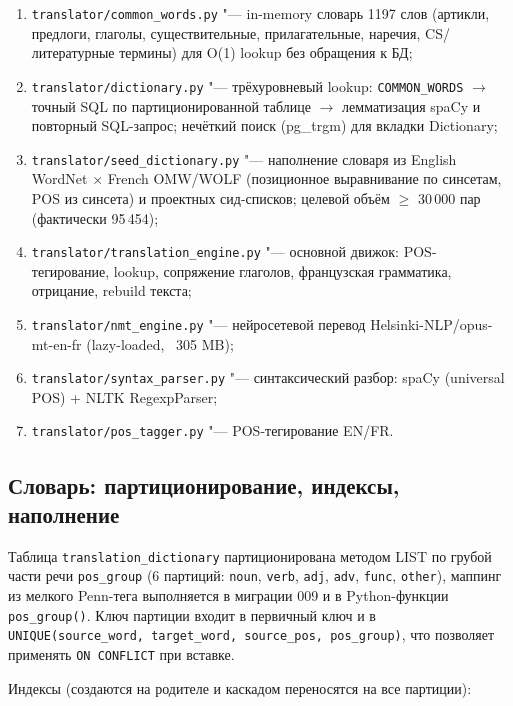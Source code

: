 \begin{enumerate}
	\item \texttt{translator/common\_words.py} "--- in-memory словарь 1197 слов
	      (артикли, предлоги, глаголы, существительные, прилагательные, наречия,
	      CS/литературные термины) для O(1) lookup без обращения к БД;
	\item \texttt{translator/dictionary.py} "--- трёхуровневый lookup:
	      \texttt{COMMON\_WORDS} $\to$ точный SQL по партиционированной
	      таблице $\to$ лемматизация spaCy и повторный SQL-запрос;
	      нечёткий поиск (pg\_trgm) для вкладки Dictionary;
	\item \texttt{translator/seed\_dictionary.py} "--- наполнение словаря
	      из English WordNet $\times$ French OMW/WOLF (позиционное выравнивание
	      по синсетам, POS из синсета) и проектных сид-списков;
	      целевой объём $\geq$ 30\,000 пар (фактически 95\,454);
	\item \texttt{translator/translation\_engine.py} "--- основной движок:
	      POS-тегирование, lookup, сопряжение глаголов, французская грамматика,
	      отрицание, rebuild текста;
	\item \texttt{translator/nmt\_engine.py} "--- нейросетевой перевод
	      Helsinki-NLP/opus-mt-en-fr (lazy-loaded, ~305 MB);
	\item \texttt{translator/syntax\_parser.py} "--- синтаксический разбор:
	      spaCy (universal POS) + NLTK RegexpParser;
	\item \texttt{translator/pos\_tagger.py} "--- POS-тегирование EN/FR.
\end{enumerate}

\subsection{Словарь: партиционирование, индексы, наполнение}

Таблица \texttt{translation\_dictionary} партиционирована методом LIST
по грубой части речи \texttt{pos\_group} (6 партиций: \texttt{noun},
\texttt{verb}, \texttt{adj}, \texttt{adv}, \texttt{func}, \texttt{other}),
маппинг из мелкого Penn-тега выполняется в миграции 009 и в Python-функции
\texttt{pos\_group()}. Ключ партиции входит в первичный ключ и в
\texttt{UNIQUE(source\_word, target\_word, source\_pos, pos\_group)},
что позволяет применять \texttt{ON CONFLICT} при вставке.

Индексы (создаются на родителе и каскадом переносятся на все партиции):

